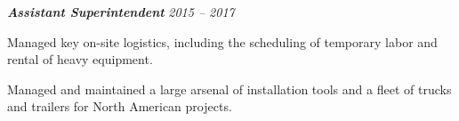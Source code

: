 \vspace{0.1cm}
\noindent
\textbf{\textit{Assistant Superintendent}} \hfill \textit{2015 -- 2017}
\begin{highlightsforbulletentries}
    \item Managed key on-site logistics, including the scheduling of temporary labor and rental of heavy equipment.
    \item Managed and maintained a large arsenal of installation tools and a fleet of trucks and trailers for North American projects.
\end{highlightsforbulletentries}





